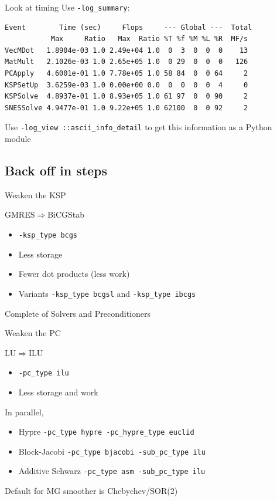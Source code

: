 \documentclass[dvipsnames]{beamer}
\begin{document}
%
\begin{frame}[fragile]{Look at timing}
Use \verb|-log_summary|:
\small
\smallskip
\begin{verbatim}
Event        Time (sec)     Flops     --- Global ---  Total
           Max     Ratio   Max  Ratio %T %f %M %L %R  MF/s
VecMDot   1.8904e-03 1.0 2.49e+04 1.0  0  3  0  0  0    13
MatMult   2.1026e-03 1.0 2.65e+05 1.0  0 29  0  0  0   126
PCApply   4.6001e-01 1.0 7.78e+05 1.0 58 84  0  0 64     2
KSPSetUp  3.6259e-03 1.0 0.00e+00 0.0  0  0  0  0  4     0
KSPSolve  4.8937e-01 1.0 8.93e+05 1.0 61 97  0  0 90     2
SNESSolve 4.9477e-01 1.0 9.22e+05 1.0 62100  0  0 92     2
\end{verbatim}
\pause
Use \verb|-log_view ::ascii_info_detail| to get this information as a Python module
\end{frame}
%
\subsection{Back off in steps}
%
\begin{frame}[fragile]{Weaken the KSP}

 GMRES\quad $\Longrightarrow$\quad BiCGStab
\begin{itemize}
  \item \verb|-ksp_type bcgs|
  \medskip
  \item Less storage
  \medskip
  \item Fewer dot products (less work)
  \medskip
  \item Variants \verb|-ksp_type bcgsl| and \verb|-ksp_type ibcgs|
\end{itemize}
\bigskip
\begin{center}
  Complete  of Solvers and Preconditioners
\end{center}
\end{frame}
%
\begin{frame}[fragile]{Weaken the PC}

 LU\quad $\Longrightarrow$\quad ILU
\begin{itemize}
  \item \verb|-pc_type ilu|
  \medskip
  \item Less storage and work
\end{itemize}
\pause
\smallskip
In parallel,
\begin{itemize}
  \item Hypre \verb|-pc_type hypre -pc_hypre_type euclid|
  \medskip
  \item Block-Jacobi \verb|-pc_type bjacobi -sub_pc_type ilu|
  \medskip
  \item Additive Schwarz \verb|-pc_type asm -sub_pc_type ilu|
\end{itemize}
\pause
\bigskip
\begin{center}
  Default for MG smoother is Chebychev/SOR(2)
\end{center}
\end{frame}
\end{document}
